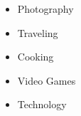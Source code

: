 \begin{itemize}
	\item Photography
	\item Traveling
	\item Cooking
	\item Video Games
	\item Technology
\end{itemize}
